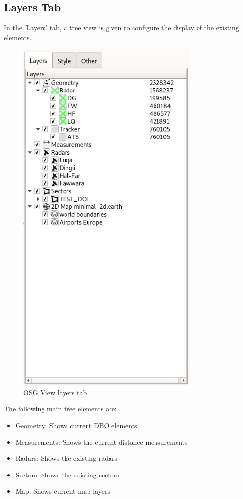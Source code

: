 \subsection{Layers Tab}

In the 'Layers' tab, a tree view is given to configure the display of the existing elements. 

\begin{figure}[H]
  \center
    \includegraphics[width=9cm,frame]{figures/osgview_layers.png}
  \caption{OSG View layers tab}
\end{figure}

The following main tree elements are:\\

\begin{itemize}
 \item Geometry: Shows current DBO elements
 \item Measurements: Shows the current distance measurements
 \item Radars: Shows the existing radars 
 \item Sectors: Shows the existing sectors
 \item Map: Shows current map layers
\end{itemize} 
 \ \\

